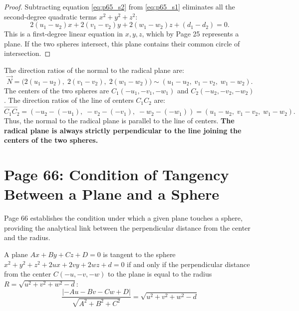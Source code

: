 \begin{proof}
Subtracting equation \eqref{eq:p65_s2} from \eqref{eq:p65_s1} eliminates all the second-degree quadratic terms $x^2 + y^2 + z^2$:
\begin{equation}
    2(u_1 - u_2)x + 2(v_1 - v_2)y + 2(w_1 - w_2)z + (d_1 - d_2) = 0.
\end{equation}
This is a first-degree linear equation in $x, y, z$, which by Page 25 represents a plane.
If the two spheres intersect, this plane contains their common circle of intersection.
\end{proof}

\begin{notebox}
The direction ratios of the normal to the radical plane are:
\begin{equation}
    \vec{N} = \bigl(2(u_1 - u_2), \; 2(v_1 - v_2), \; 2(w_1 - w_2)\bigr) \sim (u_1 - u_2, \; v_1 - v_2, \; w_1 - w_2).
\end{equation}
The centers of the two spheres are $C_1(-u_1, -v_1, -w_1)$ and $C_2(-u_2, -v_2, -w_2)$.
The direction ratios of the line of centers $C_1 C_2$ are:
\begin{equation}
    \vec{C_1 C_2} = (-u_2 - (-u_1), \; -v_2 - (-v_1), \; -w_2 - (-w_1)) = (u_1 - u_2, \; v_1 - v_2, \; w_1 - w_2).
\end{equation}
Thus, the normal to the radical plane is parallel to the line of centers.
\textbf{The radical plane is always strictly perpendicular to the line joining the centers of the two spheres.}
\end{notebox}

\section{Page 66: Condition of Tangency Between a Plane and a Sphere}
\label{sec:page66}

\begin{conceptbox}
Page 66 establishes the condition under which a given plane touches a sphere, providing the analytical link between the perpendicular distance from the center and the radius.
\end{conceptbox}

\begin{theorembox}[Condition of Tangency ($p = R$)]
A plane $Ax + By + Cz + D = 0$ is tangent to the sphere $x^2 + y^2 + z^2 + 2ux + 2vy + 2wz + d = 0$ if and only if the perpendicular distance from the center $C(-u, -v, -w)$ to the plane is equal to the radius $R = \sqrt{u^2 + v^2 + w^2 - d}$:
\begin{equation}
    \boxed{\frac{|-Au - Bv - Cw + D|}{\sqrt{A^2 + B^2 + C^2}} = \sqrt{u^2 + v^2 + w^2 - d}}
\end{equation}
\end{theorembox}

